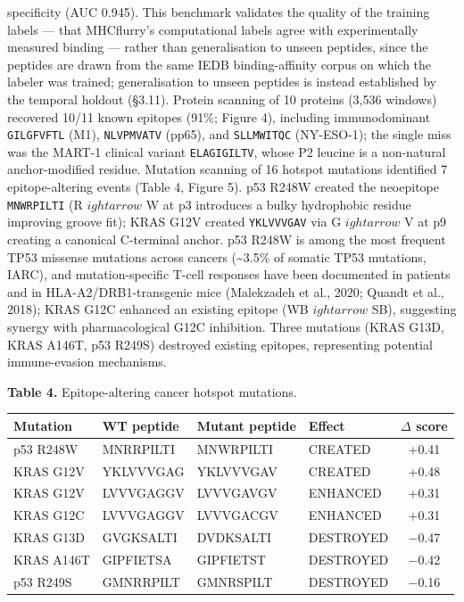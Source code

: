 \documentclass[10pt]{article}
\newcounter{none} %
\begin{document}
specificity (AUC 0.945). This benchmark validates the quality of the
training labels --- that MHCflurry's computational labels agree with
experimentally measured binding --- rather than generalisation to unseen
peptides, since the peptides are drawn from the same IEDB
binding-affinity corpus on which the labeler was trained; generalisation
to unseen peptides is instead established by the temporal holdout
(\S3.11). Protein scanning of 10 proteins (3,536 windows) recovered 10/11
known epitopes (91\%; Figure 4), including immunodominant
\texttt{GILGFVFTL} (M1), \texttt{NLVPMVATV} (pp65), and
\texttt{SLLMWITQC} (NY-ESO-1); the single miss was the MART-1 clinical
variant \texttt{ELAGIGILTV}, whose P2 leucine is a non-natural
anchor-modified residue. Mutation scanning of 16 hotspot mutations
identified 7 epitope-altering events (Table 4, Figure 5). p53 R248W
created the neoepitope \texttt{MNWRPILTI} (R $
ightarrow$ W at p3 introduces a bulky
hydrophobic residue improving groove fit); KRAS G12V created
\texttt{YKLVVVGAV} via G $
ightarrow$ V at p9 creating a canonical C-terminal anchor.
p53 R248W is among the most frequent TP53 missense mutations across
cancers (\textasciitilde3.5\% of somatic TP53 mutations, IARC), and
mutation-specific T-cell responses have been documented in patients and
in HLA-A2/DRB1-transgenic mice (Malekzadeh et al., 2020; Quandt et al.,
2018); KRAS G12C enhanced an existing epitope (WB $
ightarrow$ SB), suggesting
synergy with pharmacological G12C inhibition. Three mutations (KRAS
G13D, KRAS A146T, p53 R249S) destroyed existing epitopes, representing
potential immune-evasion mechanisms.

\textbf{Table 4.} Epitope-altering cancer hotspot mutations.

{\def\LTcaptype{none} %
\begin{longtable}[]{@{}llllc@{}}
\toprule\noalign{}
Mutation & WT peptide & Mutant peptide & Effect & $\Delta$ score \\
\midrule\noalign{}
\endhead
\bottomrule\noalign{}
\endlastfoot
p53 R248W & MNRRPILTI & MNWRPILTI & CREATED & +0.41 \\
KRAS G12V & YKLVVVGAG & YKLVVVGAV & CREATED & +0.48 \\
KRAS G12V & LVVVGAGGV & LVVVGAVGV & ENHANCED & +0.31 \\
KRAS G12C & LVVVGAGGV & LVVVGACGV & ENHANCED & +0.31 \\
KRAS G13D & GVGKSALTI & DVDKSALTI & DESTROYED & $-$0.47 \\
KRAS A146T & GIPFIETSA & GIPFIETST & DESTROYED & $-$0.42 \\
p53 R249S & GMNRRPILT & GMNRSPILT & DESTROYED & $-$0.16 \\
\end{longtable}
}
\end{document}
